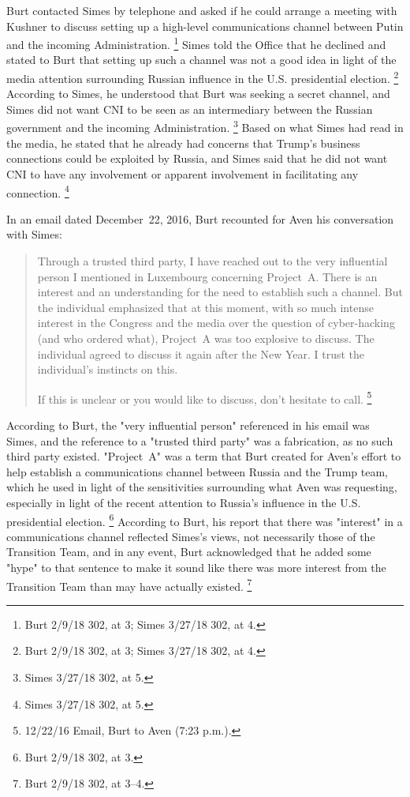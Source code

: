 Burt contacted Simes by telephone and asked if he could arrange a meeting with Kushner to discuss setting up a high-level communications channel between Putin and the incoming Administration.%
\footnote{Burt 2/9/18 302, at 3;
Simes 3/27/18 302, at 4.}
Simes told the Office that he declined and stated to Burt that setting up such a channel was not a good idea in light of the media attention surrounding Russian influence in the U.S. presidential election.%
\footnote{Burt 2/9/18 302, at 3;
Simes 3/27/18 302, at 4.}
According to Simes, he understood that Burt was seeking a secret channel, and Simes did not want CNI to be seen as an intermediary between the Russian government and the incoming Administration.%
\footnote{Simes 3/27/18 302, at 5.}
Based on what Simes had read in the media, he stated that he already had concerns that Trump's business connections could be exploited by Russia, and Simes said that he did not want CNI to have any involvement or apparent involvement in facilitating any connection.%
\footnote{Simes 3/27/18 302, at 5.}

In an email dated December~22, 2016, Burt recounted for Aven his conversation with Simes:

\begin{quote}
Through a trusted third party, I have reached out to the very influential person I mentioned in Luxembourg concerning Project~A\null.
There is an interest and an understanding for the need to establish such a channel.
But the individual emphasized that at this moment, with so much intense interest in the Congress and the media over the question of cyber-hacking (and who ordered what), Project~A was too explosive to discuss.
The individual agreed to discuss it again after the New Year.
I trust the individual's instincts on this.

If this is unclear or you would like to discuss, don't hesitate to call.%
\footnote{12/22/16 Email, Burt to Aven (7:23 p.m.).}
\end{quote}

According to Burt, the "very influential person" referenced in his email was Simes, and the reference to a "trusted third party" was a fabrication, as no such third party existed.
"Project~A" was a term that Burt created for Aven's effort to help establish a communications channel between Russia and the Trump team, which he used in light of the sensitivities surrounding what Aven was requesting, especially in light of the recent attention to Russia's influence in the U.S. presidential election.%
\footnote{Burt 2/9/18 302, at 3.}
According to Burt, his report that there was "interest" in a communications channel reflected Simes's views, not necessarily those of the Transition Team, and in any event, Burt acknowledged that he added some "hype" to that sentence to make it sound like there was more interest from the Transition Team than may have actually existed.%
\footnote{Burt 2/9/18 302, at 3--4.}

